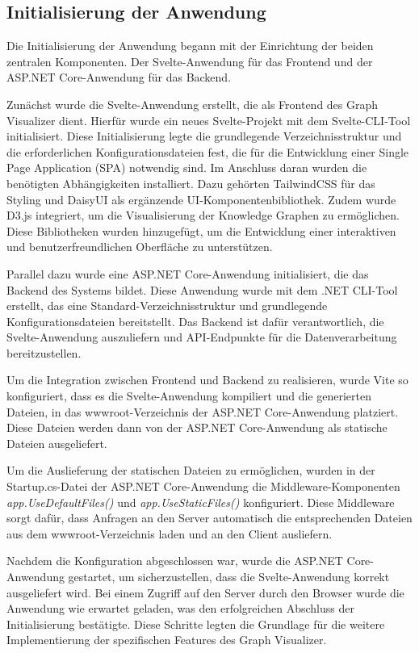 \subsection{Initialisierung der Anwendung}

Die Initialisierung der Anwendung begann mit der Einrichtung der beiden zentralen Komponenten. Der Svelte-Anwendung für das Frontend und der ASP.NET Core-Anwendung für das Backend.

Zunächst wurde die Svelte-Anwendung erstellt, die als Frontend des Graph Visualizer dient. Hierfür wurde ein neues Svelte-Projekt mit dem Svelte-CLI-Tool initialisiert. Diese Initialisierung legte die grundlegende Verzeichnisstruktur und die erforderlichen Konfigurationsdateien fest, die für die Entwicklung einer Single Page Application (SPA) notwendig sind. Im Anschluss daran wurden die benötigten Abhängigkeiten installiert. Dazu gehörten TailwindCSS für das Styling und DaisyUI als ergänzende UI-Komponentenbibliothek. Zudem wurde D3.js integriert, um die Visualisierung der Knowledge Graphen zu ermöglichen. Diese Bibliotheken wurden hinzugefügt, um die Entwicklung einer interaktiven und benutzerfreundlichen Oberfläche zu unterstützen.

Parallel dazu wurde eine ASP.NET Core-Anwendung initialisiert, die das Backend des Systems bildet. Diese Anwendung wurde mit dem .NET CLI-Tool erstellt, das eine Standard-Verzeichnisstruktur und grundlegende Konfigurationsdateien bereitstellt. Das Backend ist dafür verantwortlich, die Svelte-Anwendung auszuliefern und API-Endpunkte für die Datenverarbeitung bereitzustellen.

Um die Integration zwischen Frontend und Backend zu realisieren, wurde Vite so konfiguriert, dass es die Svelte-Anwendung kompiliert und die generierten Dateien, in das wwwroot-Verzeichnis der ASP.NET Core-Anwendung platziert. Diese Dateien werden dann von der ASP.NET Core-Anwendung als statische Dateien ausgeliefert.

Um die Auslieferung der statischen Dateien zu ermöglichen, wurden in der Startup.cs-Datei der ASP.NET Core-Anwendung die Middleware-Komponenten \textit{app.UseDefaultFiles()} und \textit{app.UseStaticFiles()} konfiguriert. Diese Middleware sorgt dafür, dass Anfragen an den Server automatisch die entsprechenden Dateien aus dem wwwroot-Verzeichnis laden und an den Client ausliefern.

Nachdem die Konfiguration abgeschlossen war, wurde die ASP.NET Core-Anwendung gestartet, um sicherzustellen, dass die Svelte-Anwendung korrekt ausgeliefert wird. Bei einem Zugriff auf den Server durch den Browser wurde die Anwendung wie erwartet geladen, was den erfolgreichen Abschluss der Initialisierung bestätigte. Diese Schritte legten die Grundlage für die weitere Implementierung der spezifischen Features des Graph Visualizer.

